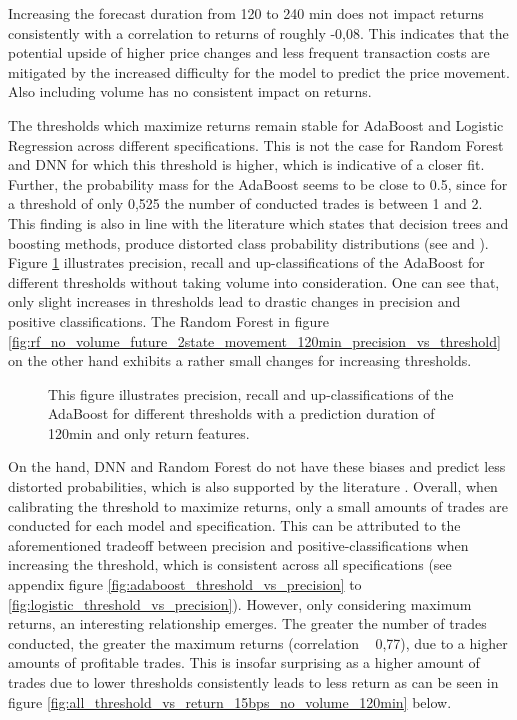 Increasing the forecast duration from 120 to 240 min does not impact returns consistently with a correlation to returns of roughly -0,08. 
This indicates that the potential upside of higher price changes and less frequent transaction costs are mitigated 
by the increased difficulty for the model to predict the price movement. 
Also including volume has no consistent impact on returns.

The thresholds which maximize returns remain stable for AdaBoost and Logistic Regression across different specifications.
This is not the case for Random Forest and DNN for which this threshold is higher, which is indicative of a closer fit.
Further, the probability mass for the AdaBoost seems to be close to 0.5, 
since for a threshold of only 0,525 the number of conducted trades is between 1 and 2. This finding is also in line with the literature 
which states that decision trees and boosting methods, produce distorted class probability distributions
(see \cite{caruana2005probabilityDistortion} and \cite{zadrozny2005calibratedProbabilties}).
Figure \ref{fig:adaboost_no_volume_future_2state_movement_120min_precision_vs_threshold} illustrates precision, recall and up-classifications of the AdaBoost for different thresholds
without taking volume into consideration. One can see that, only slight increases in thresholds 
lead to drastic changes in precision and positive classifications. The Random Forest in figure \ref{fig:rf_no_volume_future_2state_movement_120min_precision_vs_threshold}
on the other hand exhibits a rather small changes for increasing thresholds.

\begin{figure}[H]
    \captionsetup{format=plain}
    \caption{ 
            This figure illustrates precision, recall and up-classifications of the AdaBoost for different thresholds
            with a prediction duration of 120min and only return features.
        }
    \label{fig:adaboost_no_volume_future_2state_movement_120min_precision_vs_threshold}
\end{figure}

On the hand, DNN and Random Forest do not have these biases
and predict less distorted probabilities, which is also supported by the literature \cite{caruana2005probabilityDistortion}. 
Overall, when calibrating the threshold to maximize returns, only a small amounts of trades are conducted for each model and specification.
This can be attributed to the aforementioned tradeoff between precision and positive-classifications when increasing the threshold, 
which is consistent across all specifications
(see appendix figure \ref{fig:adaboost_threshold_vs_precision} to \ref{fig:logistic_threshold_vs_precision}). 
However, only considering maximum returns, an interesting relationship emerges. 
The greater the number of trades conducted, the greater the maximum returns (correlation ~ 0,77), due to a higher amounts of profitable trades.
This is insofar surprising as a higher amount of trades due to lower thresholds consistently leads to less return as can be seen in figure 
\ref{fig:all_threshold_vs_return_15bps_no_volume_120min} below.

